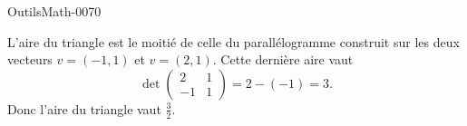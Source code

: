 
\begin{corrige}{OutilsMath-0070}

    L'aire du triangle est le moitié de celle du parallélogramme construit sur les deux vecteurs $v=(-1,1)$ et $v=(2,1)$. Cette dernière aire vaut
    \begin{equation}
        \det\begin{pmatrix}
            2    &   1    \\ 
            -1    &   1    
        \end{pmatrix}=2-(-1)=3.
    \end{equation}
    Donc l'aire du triangle vaut $\frac{ 3 }{2}$.

\end{corrige}
